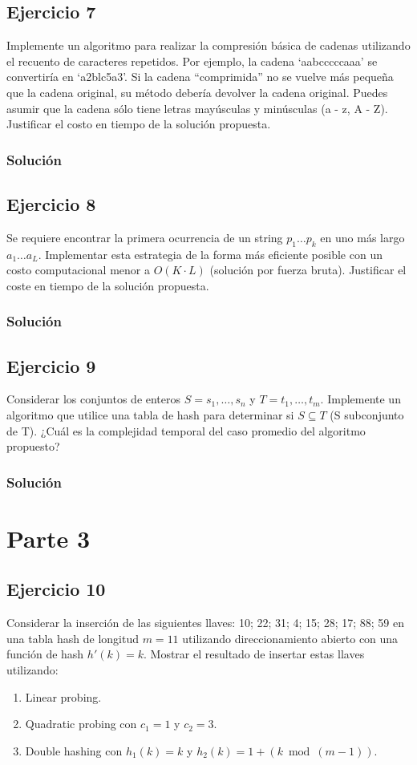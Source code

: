 \documentclass{article}
\begin{document}
\subsection*{Ejercicio 7}
Implemente un algoritmo para realizar la compresión básica de cadenas utilizando el recuento de caracteres repetidos. Por ejemplo, la cadena `aabcccccaaa' se convertiría en `a2blc5a3'. Si la cadena ``comprimida'' no se vuelve más pequeña que la cadena original, su método debería devolver la cadena original. Puedes asumir que la cadena sólo tiene letras mayúsculas y minúsculas (a - z, A - Z). Justificar el costo en tiempo de la solución propuesta.
\subsubsection*{Solución}


\subsection*{Ejercicio 8}
Se requiere encontrar la primera ocurrencia de un string $p_1 \dots p_k$ en uno más largo $a_1 \dots a_L$. Implementar esta estrategia de la forma más eficiente posible con un costo computacional menor a $O(K\cdot L)$ (solución por fuerza bruta). Justificar el coste en tiempo de la solución propuesta.
\subsubsection*{Solución}


\subsection*{Ejercicio 9}
Considerar los conjuntos de enteros $S = {s_1, \dots , s_n}$ y $T = {t_1, \dots , t_m}$. Implemente un algoritmo que utilice una tabla de hash para determinar si $S \subseteq T$ (S subconjunto de T). ¿Cuál es la complejidad temporal del caso promedio del algoritmo propuesto?
\subsubsection*{Solución}


\section*{Parte 3}
\subsection*{Ejercicio 10}
Considerar la inserción de las siguientes llaves: 10; 22; 31; 4; 15; 28; 17; 88; 59 en una tabla hash de longitud $m = 11$ utilizando direccionamiento abierto con una función de hash $h'(k) = k$. Mostrar el resultado de insertar estas llaves utilizando:
\begin{enumerate}
    \item Linear probing.
    \item Quadratic probing con $c_1 = 1$ y $c_2 = 3$.
    \item Double hashing con $h_1(k) = k$ y $h_2(k) = 1 +(k \bmod ( m - 1))$.
\end{enumerate}
\end{document}
